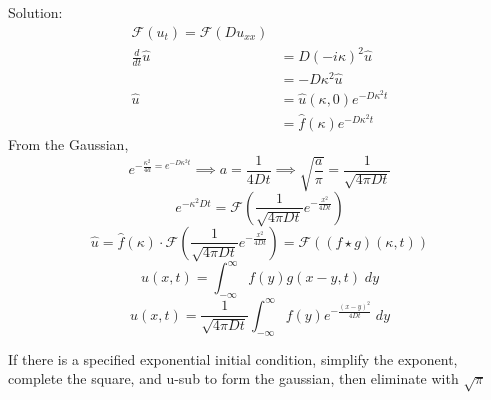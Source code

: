 \documentclass[12pt]{article}
\renewcommand{\hat}[1]{\widehat{#1}}
\newcommand{\F}[1]{\mathcal{F}(#1)}
\begin{document}
Solution:
\begin{align*}
    \F{u_t} =\F{Du_{xx}}\\
    \frac{d}{dt} \hat{u} &= D(-i\kappa)^2 \hat{u}\\
    &= -D\kappa^2 \hat{u}\\
    \hat{u} &= \hat{u}(\kappa, 0)e^{-D\kappa^2t}\\
    &= \hat{f}(\kappa) e^{-D\kappa^2t}
\end{align*}
From the Gaussian, 
\[e^{-\frac{\kappa^2}{4a} = e^{-D\kappa^2t}}\implies a = \frac{1}{4Dt} \implies \sqrt{\frac{a}{\pi}} = \frac{1}{\sqrt{4\pi Dt}}\]
\[e^{-\kappa^2Dt} = \F{\frac{1}{\sqrt{4\pi Dt}}e^{-\frac{x^2}{4Dt}}}\]
\[\hat{u} = \hat{f}(\kappa) \cdot \F{\frac{1}{\sqrt{4\pi Dt}}e^{-\frac{x^2}{4Dt}}} = \F{(f \star g)(\kappa, t)}\]
\[u(x, t) = \int_{-\infty}^{\infty} f(y) g(x - y, t)\; dy\]
\[u(x, t) = \frac{1}{\sqrt{4\pi Dt}} \int_{-\infty}^{\infty} f(y) e^{-\frac{(x - y)^2}{4Dt}} \; dy\]

If there is a specified exponential initial condition, simplify the exponent, complete the square, and u-sub to form the gaussian, then eliminate with $\sqrt{\pi}$
\end{document}
